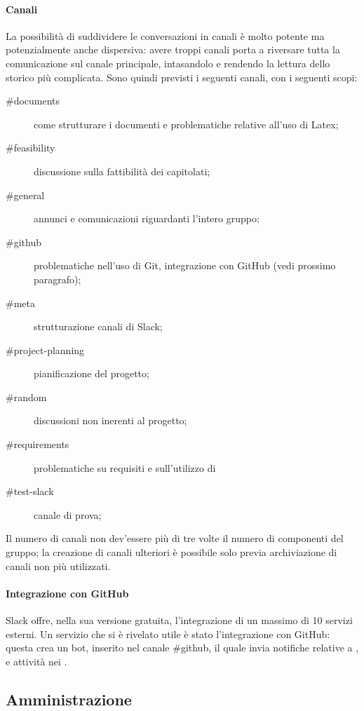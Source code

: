 \paragraph{Canali} La possibilità di suddividere le conversazioni in canali è molto potente ma potenzialmente anche dispersiva: avere troppi canali porta a riversare tutta la comunicazione sul canale principale, intasandolo e rendendo la lettura dello storico più complicata. Sono quindi previsti i seguenti canali, con i seguenti scopi:
\begin{description}
	\item[\#documents] come strutturare i documenti e problematiche relative all'uso di Latex;
	\item[\#feasibility] discussione sulla fattibilità dei capitolati;
	\item[\#general] annunci e comunicazioni riguardanti l'intero gruppo;
	\item[\#github] problematiche nell'uso di Git, integrazione con GitHub (vedi prossimo paragrafo);
	\item[\#meta] strutturazione canali di Slack;
	\item[\#project-planning] pianificazione del progetto;
	\item[\#random] discussioni non inerenti al progetto;
	\item[\#requirements] problematiche su requisiti e sull'utilizzo di 
	\item[\#test-slack] canale di prova;
\end{description}
Il numero di canali non dev'essere più di tre volte il numero di componenti del gruppo; la creazione di canali ulteriori è possibile solo previa archiviazione di canali non più utilizzati.
\paragraph{Integrazione con GitHub} Slack offre, nella sua versione gratuita, l'integrazione di un massimo di 10 servizi esterni. Un servizio che si è rivelato utile è stato l'integrazione con GitHub: questa crea un bot, inserito nel canale \#github, il quale invia notifiche relative a ,  e attività nei .



\subsection{Amministrazione}

